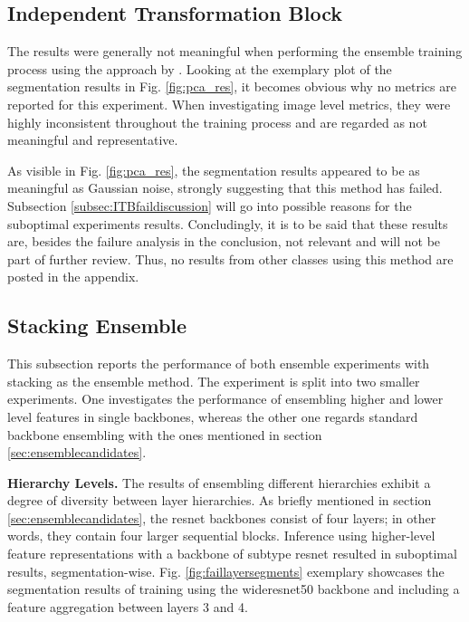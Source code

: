 \subsection{Independent Transformation Block}
\label{subsec:ITBfail}

The results were generally not meaningful when performing the ensemble training process using the approach by \cite{EnsembleHeller2023}. Looking at the exemplary plot of the segmentation 
results in Fig. \ref{fig:pca_res}, it becomes obvious why no metrics are reported for this experiment. When investigating image level metrics, they were highly inconsistent throughout 
the training process and are regarded as not meaningful and representative.



As visible in Fig. \ref{fig:pca_res}, the segmentation results appeared to be as meaningful as Gaussian noise, strongly suggesting that this method has failed. Subsection 
\ref{subsec:ITBfaildiscussion} will go into possible reasons for the suboptimal experiments results. Concludingly, it is to be said that these results are, besides the failure analysis 
in the conclusion, not relevant and will not be part of further review. Thus, no results from other classes using this method are posted in the appendix.

\subsection{Stacking Ensemble}
\label{subsec:stacking}
This subsection reports the performance of both ensemble experiments with stacking as the ensemble method. 
The experiment is split into two smaller experiments. One investigates the performance of ensembling higher and lower level features in 
single backbones, whereas the other one regards standard backbone ensembling with the ones mentioned in section \ref{sec:ensemblecandidates}. 






\textbf{Hierarchy Levels.} The results of ensembling different hierarchies exhibit a degree of diversity between layer hierarchies. As briefly mentioned in section \ref{sec:ensemblecandidates}, the resnet backbones consist of four 
layers; in other words, they contain four larger sequential blocks. Inference using higher-level feature representations with a backbone of subtype resnet resulted in suboptimal results, segmentation-wise. 
Fig. \ref{fig:faillayersegments} exemplary showcases the segmentation results of training using the wideresnet50 backbone and including a feature aggregation between layers 3 and 4. 

